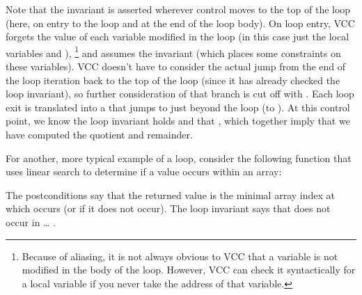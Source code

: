 Note that the invariant is asserted wherever control moves to the top of the
loop (here, on entry to the loop and at the end of the loop body). On
loop entry, VCC forgets the value of each variable modified in the
loop (in this case just the local variables  and ),%
\footnote{ Because of aliasing, it is not always obvious to VCC that a
  variable is not modified in the body of the loop. However, VCC can
  check it syntactically for a local variable if you never take the
  address of that variable.}
and assumes the invariant (which places some constraints on these
variables).  VCC doesn't have to consider the actual jump from the end
of the loop iteration back to the top of the loop (since it has
already checked the loop invariant), so further consideration of that
branch is cut off with .  Each loop exit is
translated into a  that jumps to just beyond the loop (to
). At this control point, we know the loop invariant
holds and that , which together imply that we have
computed the quotient and remainder.


For another, more typical example of a loop, consider 
the following function that uses linear search to determine if a value
occurs within an array:



\noindent
The postconditions say that the returned value is the minimal array
index at which  occurs (or  if it does not occur).
The loop invariant says that   does not occur in \dots
{}.


